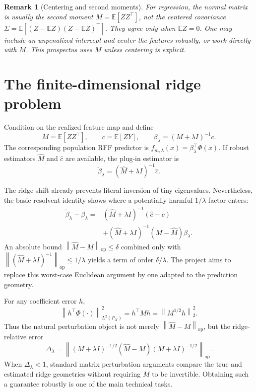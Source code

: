 \documentclass[11pt]{article}
\newtheorem{remark}[definition]{Remark}
\newcommand{\E}{\mathbb{E}}
\newcommand{\op}{\mathrm{op}}
\newcommand{\norm}[1]{\left\lVert #1\right\rVert}
\begin{document}
\begin{remark}[Centering and second moments]
For regression, the normal matrix is usually the second moment
$M=\E[ZZ^\top]$, not the centered covariance
$\Sigma=\E[(Z-\E Z)(Z-\E Z)^\top]$.  They agree only when $\E Z=0$.
One may include an unpenalized intercept and center the features robustly, or
work directly with $M$.  This prospectus uses $M$ unless centering is explicit.
\end{remark}

\section{The finite-dimensional ridge problem}

Condition on the realized feature map and define
\begin{equation}\label{eq:moments}
 M=\E[ZZ^\top],\qquad c=\E[ZY],\qquad
 \beta_\lambda=(M+\lambda I)^{-1}c.
\end{equation}
The corresponding population RFF predictor is
$f_{m,\lambda}(x)=\beta_\lambda^\top\Phi(x)$.  If robust estimators
$\widehat M$ and $\widehat c$ are available, the plug-in estimator is
\begin{equation}\label{eq:plugin}
 \widetilde\beta_\lambda=(\widehat M+\lambda I)^{-1}\widehat c.
\end{equation}

The ridge shift already prevents literal inversion of tiny eigenvalues.
Nevertheless, the basic resolvent identity shows where a potentially harmful
$1/\lambda$ factor enters:
\begin{align}
 \widetilde\beta_\lambda-\beta_\lambda
 ={}&(\widehat M+\lambda I)^{-1}(\widehat c-c)\nonumber\\
 &+(\widehat M+\lambda I)^{-1}(M-\widehat M)\beta_\lambda.
 \label{eq:resolvent}
\end{align}
An absolute bound $\norm{\widehat M-M}_\op\leq\delta$ combined only with
$\norm{(\widehat M+\lambda I)^{-1}}_\op\leq1/\lambda$ yields a term of order
$\delta/\lambda$.  The project aims to replace this worst-case Euclidean
argument by one adapted to the prediction geometry.

For any coefficient error $h$,
\begin{equation}\label{eq:pred-norm}
 \norm{h^\top\Phi(\cdot)}_{L^2(P_X)}^2=h^\top M h
 =\norm{M^{1/2}h}_2^2.
\end{equation}
Thus the natural perturbation object is not merely
$\norm{\widehat M-M}_\op$, but the ridge-relative error
\begin{equation}\label{eq:relative}
 \Delta_\lambda=
 \norm{(M+\lambda I)^{-1/2}(\widehat M-M)
       (M+\lambda I)^{-1/2}}_\op.
\end{equation}
When $\Delta_\lambda<1$, standard matrix perturbation arguments compare the
true and estimated ridge geometries without requiring $M$ to be invertible.
Obtaining such a guarantee robustly is one of the main technical tasks.
\end{document}

